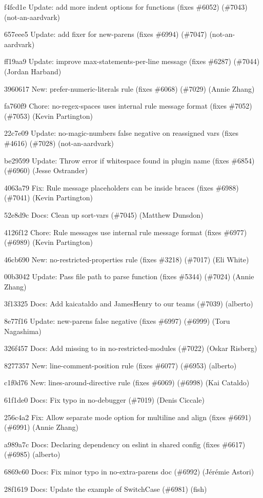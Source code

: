 \begin{DoxyItemize}
\item f4fcd1e Update\+: add more {\ttfamily indent} options for functions (fixes \#6052) (\#7043) (not-\/an-\/aardvark)
\item 657eee5 Update\+: add fixer for new-\/parens (fixes \#6994) (\#7047) (not-\/an-\/aardvark)
\item ff19aa9 Update\+: improve {\ttfamily max-\/statements-\/per-\/line} message (fixes \#6287) (\#7044) (Jordan Harband)
\item 3960617 New\+: {\ttfamily prefer-\/numeric-\/literals} rule (fixes \#6068) (\#7029) (Annie Zhang)
\item fa760f9 Chore\+: no-\/regex-\/spaces uses internal rule message format (fixes \#7052) (\#7053) (Kevin Partington)
\item 22c7e09 Update\+: no-\/magic-\/numbers false negative on reassigned vars (fixes \#4616) (\#7028) (not-\/an-\/aardvark)
\item be29599 Update\+: Throw error if whitespace found in plugin name (fixes \#6854) (\#6960) (Jesse Ostrander)
\item 4063a79 Fix\+: Rule message placeholders can be inside braces (fixes \#6988) (\#7041) (Kevin Partington)
\item 52e8d9c Docs\+: Clean up sort-\/vars (\#7045) (Matthew Dunsdon)
\item 4126f12 Chore\+: Rule messages use internal rule message format (fixes \#6977) (\#6989) (Kevin Partington)
\item 46cb690 New\+: {\ttfamily no-\/restricted-\/properties} rule (fixes \#3218) (\#7017) (Eli White)
\item 00b3042 Update\+: Pass file path to parse function (fixes \#5344) (\#7024) (Annie Zhang)
\item 3f13325 Docs\+: Add kaicataldo and James\+Henry to our teams (\#7039) (alberto)
\item 8e77f16 Update\+: {\ttfamily new-\/parens} false negative (fixes \#6997) (\#6999) (Toru Nagashima)
\item 326f457 Docs\+: Add missing \textquotesingle{}to\textquotesingle{} in no-\/restricted-\/modules (\#7022) (Oskar Risberg)
\item 8277357 New\+: {\ttfamily line-\/comment-\/position} rule (fixes \#6077) (\#6953) (alberto)
\item c1f0d76 New\+: {\ttfamily lines-\/around-\/directive} rule (fixes \#6069) (\#6998) (Kai Cataldo)
\item 61f1de0 Docs\+: Fix typo in no-\/debugger (\#7019) (Denis Ciccale)
\item 256c4a2 Fix\+: Allow separate mode option for multiline and align (fixes \#6691) (\#6991) (Annie Zhang)
\item a989a7c Docs\+: Declaring dependency on eslint in shared config (fixes \#6617) (\#6985) (alberto)
\item 6869c60 Docs\+: Fix minor typo in no-\/extra-\/parens doc (\#6992) (Jérémie Astori)
\item 28f1619 Docs\+: Update the example of Switch\+Case (\#6981) (fish)
\end{DoxyItemize}

